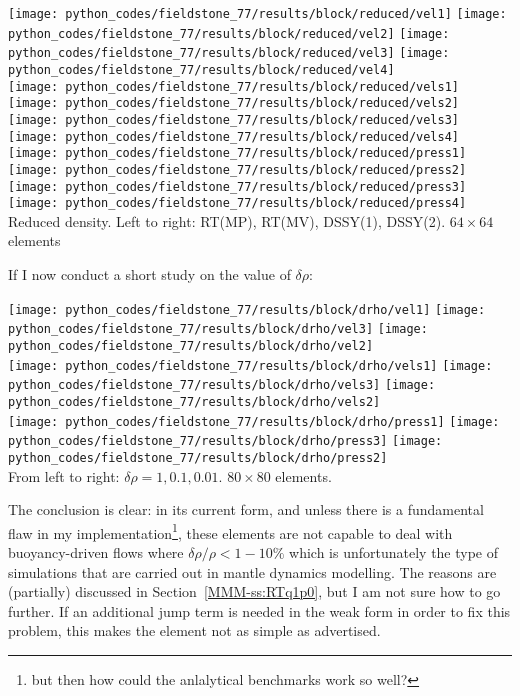 \begin{center}
\texttt{[image: python\_codes/fieldstone\_77/results/block/reduced/vel1]}
\texttt{[image: python\_codes/fieldstone\_77/results/block/reduced/vel2]}
\texttt{[image: python\_codes/fieldstone\_77/results/block/reduced/vel3]}
\texttt{[image: python\_codes/fieldstone\_77/results/block/reduced/vel4]}\\
\texttt{[image: python\_codes/fieldstone\_77/results/block/reduced/vels1]}
\texttt{[image: python\_codes/fieldstone\_77/results/block/reduced/vels2]}
\texttt{[image: python\_codes/fieldstone\_77/results/block/reduced/vels3]}
\texttt{[image: python\_codes/fieldstone\_77/results/block/reduced/vels4]}\\
\texttt{[image: python\_codes/fieldstone\_77/results/block/reduced/press1]}
\texttt{[image: python\_codes/fieldstone\_77/results/block/reduced/press2]}
\texttt{[image: python\_codes/fieldstone\_77/results/block/reduced/press3]}
\texttt{[image: python\_codes/fieldstone\_77/results/block/reduced/press4]}\\
{\captionfont Reduced density. Left to right: RT(MP), RT(MV), DSSY(1), DSSY(2). $64\times 64$ elements}
\end{center}


If I now conduct a short study on the value of $\delta\rho$:

\begin{center}
\texttt{[image: python\_codes/fieldstone\_77/results/block/drho/vel1]}
\texttt{[image: python\_codes/fieldstone\_77/results/block/drho/vel3]}
\texttt{[image: python\_codes/fieldstone\_77/results/block/drho/vel2]}\\
\texttt{[image: python\_codes/fieldstone\_77/results/block/drho/vels1]}
\texttt{[image: python\_codes/fieldstone\_77/results/block/drho/vels3]}
\texttt{[image: python\_codes/fieldstone\_77/results/block/drho/vels2]}\\
\texttt{[image: python\_codes/fieldstone\_77/results/block/drho/press1]}
\texttt{[image: python\_codes/fieldstone\_77/results/block/drho/press3]}
\texttt{[image: python\_codes/fieldstone\_77/results/block/drho/press2]}\\
{\captionfont From left to right: $\delta \rho=1,0.1,0.01$. $80 \times 80$ elements.}
\end{center}

The conclusion is clear: in its current form, and unless there is a fundamental 
flaw in my implementation\footnote{but then how could the anlalytical benchmarks work 
so well?}, these elements are not capable to 
deal with buoyancy-driven flows where $\delta \rho/\rho < 1-10\%$ which is 
unfortunately the type of simulations that are carried out in mantle dynamics modelling.
The reasons are (partially) discussed in Section~\ref{MMM-ss:RTq1p0}, but 
I am not sure how to go further. If an additional jump term is needed in the 
weak form in order to fix this problem, this makes the element not as simple as
advertised. 





